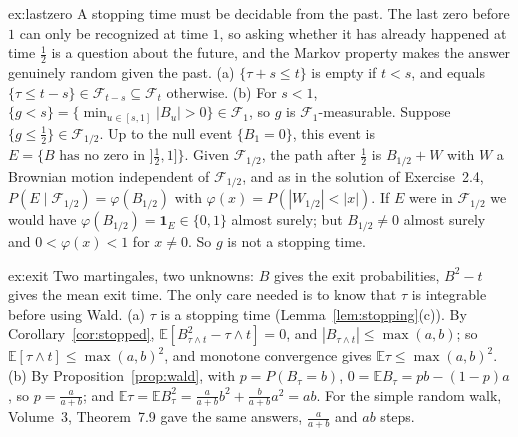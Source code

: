 \begin{solution}{ex:lastzero}
\idea A stopping time must be decidable from the past. The last zero before $1$ can only be recognized at time $1$, so asking whether it has already happened at time $\frac12$ is a question about the future,
and the Markov property makes the answer genuinely random given the past.
\writeup (a) $\{\tau+s\le t\}$ is empty if $t<s$, and equals $\{\tau\le t-s\}\in\mathcal F_{t-s}\subseteq\mathcal F_t$ otherwise.
(b) For $s<1$, $\{g<s\}=\{\min_{u\in[s,1]}|B_u|>0\}\in\mathcal F_1$, so $g$ is $\mathcal F_1$-measurable. Suppose $\{g\le\frac12\}\in\mathcal F_{1/2}$. Up to the null event $\{B_1=0\}$, this event is
$E=\{B\text{ has no zero in }]\frac12,1]\}$. Given $\mathcal F_{1/2}$, the path after $\frac12$ is $B_{1/2}+W$ with $W$ a Brownian motion independent of $\mathcal F_{1/2}$, and as in the solution of Exercise~2.4,
$P(E\mid\mathcal F_{1/2})=\varphi(B_{1/2})$ with $\varphi(x)=P(|W_{1/2}|<|x|)$. If $E$ were in $\mathcal F_{1/2}$ we would have $\varphi(B_{1/2})=\mathbf 1_E\in\{0,1\}$ almost surely; but $B_{1/2}\ne0$ almost surely and
$0<\varphi(x)<1$ for $x\ne0$. So $g$ is not a stopping time.
\end{solution}

\begin{solution}{ex:exit}
\idea Two martingales, two unknowns: $B$ gives the exit probabilities, $B^2-t$ gives the mean exit time. The only care needed is to know that $\tau$ is integrable before using Wald.
\writeup (a) $\tau$ is a stopping time (Lemma~\ref{lem:stopping}(c)). By Corollary~\ref{cor:stopped}, $\mathbb E[B^2_{\tau\wedge t}-\tau\wedge t]=0$, and $|B_{\tau\wedge t}|\le\max(a,b)$; so
$\mathbb E[\tau\wedge t]\le\max(a,b)^2$, and monotone convergence gives $\mathbb E\tau\le\max(a,b)^2$. (b) By Proposition~\ref{prop:wald}, with $p=P(B_\tau=b)$, $0=\mathbb EB_\tau=pb-(1-p)a$, so $p=\frac a{a+b}$; and
$\mathbb E\tau=\mathbb EB_\tau^2=\frac a{a+b}b^2+\frac b{a+b}a^2=ab$. For the simple random walk, Volume~3, Theorem~7.9 gave the same answers, $\frac a{a+b}$ and $ab$ steps.
\end{solution}

